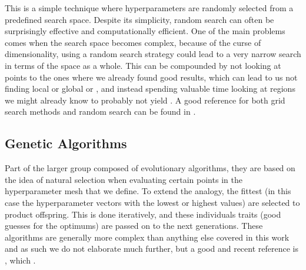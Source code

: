 This is a simple technique where hyperparameters are randomly selected from a predefined search space. Despite its simplicity, random search can often be surprisingly effective and computationally efficient. One of the main problems comes when the search space becomes complex, because of the curse of dimensionality, using a random search strategy could lead to a very narrow search in terms of the space as a whole. This can be compounded by not looking at points  to the ones where we already found good results, which can lead to us not finding local or global  or , and instead spending valuable time looking at regions we might already know to probably not yield . A good reference for both grid search methods and random search can be found in \cite{bergstra2012random}.

\subsection{Genetic Algorithms}

Part of the larger group composed of evolutionary algorithms, they are based on the idea of natural selection when evaluating certain points in the hyperparameter mesh that we define. To extend the analogy, the fittest (in this case the hyperparameter vectors with the lowest or highest values) are selected to product offspring. This is done iteratively, and these individuals traits (good guesses for the optimums) are passed on to the next generations. These algorithms are generally more complex than anything else covered in this work and as such we do not elaborate much further, but a good and recent reference is \cite{xiao2020efficient}, which . 